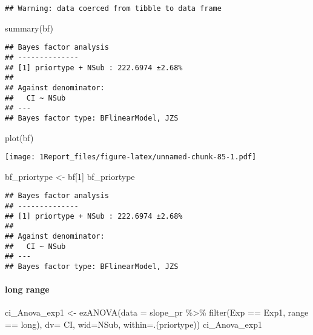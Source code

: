 \documentclass[
]{article}
\newenvironment{Shaded}{\begin{snugshade}}{\end{snugshade}}
\newcommand{\AttributeTok}[1]{\textcolor[rgb]{0.77,0.63,0.00}{#1}}
\newcommand{\DecValTok}[1]{\textcolor[rgb]{0.00,0.00,0.81}{#1}}
\newcommand{\FunctionTok}[1]{\textcolor[rgb]{0.00,0.00,0.00}{#1}}
\newcommand{\NormalTok}[1]{#1}
\newcommand{\OtherTok}[1]{\textcolor[rgb]{0.56,0.35,0.01}{#1}}
\newcommand{\SpecialCharTok}[1]{\textcolor[rgb]{0.00,0.00,0.00}{#1}}
\newcommand{\StringTok}[1]{\textcolor[rgb]{0.31,0.60,0.02}{#1}}
\begin{document}
\begin{verbatim}
## Warning: data coerced from tibble to data frame
\end{verbatim}

\begin{Shaded}
\begin{Highlighting}[]
\FunctionTok{summary}\NormalTok{(bf)}
\end{Highlighting}
\end{Shaded}

\begin{verbatim}
## Bayes factor analysis
## --------------
## [1] priortype + NSub : 222.6974 ±2.68%
## 
## Against denominator:
##   CI ~ NSub 
## ---
## Bayes factor type: BFlinearModel, JZS
\end{verbatim}

\begin{Shaded}
\begin{Highlighting}[]
\FunctionTok{plot}\NormalTok{(bf)}
\end{Highlighting}
\end{Shaded}

\texttt{[image: 1Report\_files/figure-latex/unnamed-chunk-85-1.pdf]}

\begin{Shaded}
\begin{Highlighting}[]
\NormalTok{ bf\_priortype }\OtherTok{\textless{}{-}}\NormalTok{ bf[}\DecValTok{1}\NormalTok{]}
\NormalTok{ bf\_priortype}
\end{Highlighting}
\end{Shaded}

\begin{verbatim}
## Bayes factor analysis
## --------------
## [1] priortype + NSub : 222.6974 ±2.68%
## 
## Against denominator:
##   CI ~ NSub 
## ---
## Bayes factor type: BFlinearModel, JZS
\end{verbatim}

\hypertarget{long-range}{%
\paragraph{long range}\label{long-range}}

\begin{Shaded}
\begin{Highlighting}[]
\NormalTok{ci\_Anova\_exp1 }\OtherTok{\textless{}{-}} \FunctionTok{ezANOVA}\NormalTok{(}\AttributeTok{data =}\NormalTok{ slope\_pr }\SpecialCharTok{\%\textgreater{}\%} \FunctionTok{filter}\NormalTok{(Exp }\SpecialCharTok{==} \StringTok{\textquotesingle{}Exp1\textquotesingle{}}\NormalTok{, range }\SpecialCharTok{==} \StringTok{\textquotesingle{}long\textquotesingle{}}\NormalTok{), }\AttributeTok{dv=}\NormalTok{ CI, }\AttributeTok{wid=}\NormalTok{NSub, }\AttributeTok{within=}\NormalTok{.(priortype))}
\NormalTok{ci\_Anova\_exp1}
\end{Highlighting}
\end{Shaded}
\end{document}
